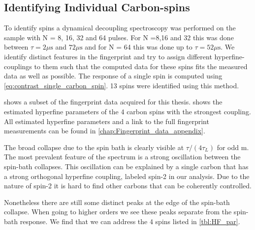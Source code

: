 \subsection*{Identifying Individual Carbon-spins}
To identify spins a dynamical decoupling spectroscopy was performed on the sample with N = 8, 16, 32 and 64 pulses. For N =8,16 and 32 this was done between $\tau = 2 \mu \mathrm{s}$  and $72 \mu \mathrm{s}$ and for N = 64 this was done up to $\tau = 52 \mu \mathrm{s}$.
We identify distinct features in the fingerprint and try to assign different hyperfine-couplings to them such that the computed data for these spins fits the measured data as well as possible.
The response of a single spin is computed using \cref{eq:contrast_single_carbon_spin}.
13 spins were identified using this method.

 shows a subset of the fingerprint data acquired for this thesis.  shows the estimated hyperfine parameters of the 4 carbon spins with the strongest coupling.
All estimated hyperfine parameters and a link to the full fingerprint measurements can be found in \cref{chap:Fingerprint_data_appendix}.

The broad collapse due to the spin bath is clearly visible at $\tau/(4 \tau _L)$ for odd m.
The most prevalent feature of the spectrum is a strong oscillation between the spin-bath collapses.
This oscillation can be explained by a single carbon that has a strong orthogonal hyperfine coupling, labeled spin-2 in our analysis.
Due to the nature of spin-2 it is hard to find other carbons that can be coherently controlled.

Nonetheless there are still some distinct peaks at the edge of the spin-bath collapse. When going to higher orders we see these peaks separate from the spin-bath response.
We find that we can address the 4 spins listed in \cref{tbl:HF_par}. %


